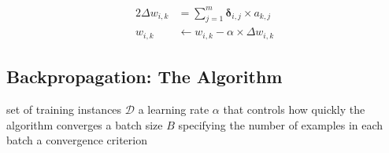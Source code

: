 \documentclass[xcolor={table}]{beamer}
\begin{document}
 \begin{frame} 
\begin{alignat}{2}
\Delta w_{i,k} &= \sum_{j=1}^m \boldsymbol{\delta}_{i,j} \times  a_{k,j} \label{eq:epochweightgradient}\\
w_{i,k} &\leftarrow w_{i,k} - \alpha \times \Delta w_{i,k}
\label{eqn:batchweightupdaterule}
\end{alignat}
\end{frame} 


\subsection{Backpropagation: The Algorithm}

\begin{frame}
\scriptsize
\begin{algorithmic}[1]
\Require set of training instances $\mathcal{D}$
\Require a learning rate $\alpha$ that controls how quickly the algorithm converges
\Require a batch size $B$ specifying the number of examples in each batch
\Require a convergence criterion 
\end{algorithmic}
\end{frame}
\end{document}
